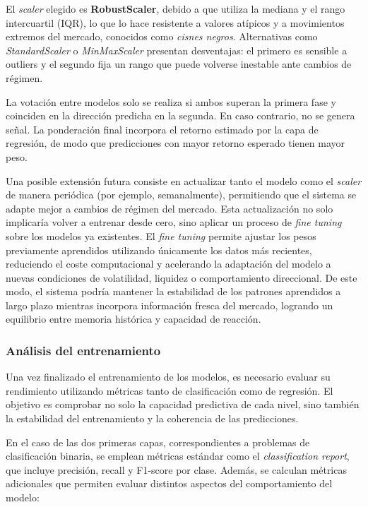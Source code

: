 El \textit{scaler} elegido es \textbf{RobustScaler}, debido a que utiliza la mediana y el rango intercuartil (IQR), lo que lo hace resistente a
valores atípicos y a movimientos extremos del mercado, conocidos como \textit{cisnes negros}. Alternativas como \textit{StandardScaler} o
\textit{MinMaxScaler} presentan desventajas: el primero es sensible a outliers y el segundo fija un rango que puede volverse inestable ante cambios de
régimen.

La votación entre modelos solo se realiza si ambos superan la primera fase y coinciden en la dirección predicha en la segunda. En caso contrario, no
se genera señal. La ponderación final incorpora el retorno estimado por la capa de regresión, de modo que predicciones con mayor retorno esperado
tienen mayor peso.

Una posible extensión futura consiste en actualizar tanto el modelo como el \textit{scaler} de manera periódica (por ejemplo, semanalmente),
permitiendo que el sistema se adapte mejor a cambios de régimen del mercado. Esta actualización no solo implicaría volver a entrenar desde cero, sino
aplicar un proceso de \textit{fine tuning} sobre los modelos ya existentes. El \textit{fine tuning} permite ajustar los pesos previamente aprendidos
utilizando únicamente los datos más recientes, reduciendo el coste computacional y acelerando la adaptación del modelo a nuevas condiciones de
volatilidad, liquidez o comportamiento direccional. De este modo, el sistema podría mantener la estabilidad de los patrones aprendidos a largo plazo
mientras incorpora información fresca del mercado, logrando un equilibrio entre memoria histórica y capacidad de reacción.

\subsubsection{Análisis del entrenamiento}

Una vez finalizado el entrenamiento de los modelos, es necesario evaluar su rendimiento utilizando métricas tanto de clasificación como de regresión.
El objetivo es comprobar no solo la capacidad predictiva de cada nivel, sino también la estabilidad del entrenamiento y la coherencia de las
predicciones.

En el caso de las dos primeras capas, correspondientes a problemas de clasificación binaria, se emplean métricas estándar como el
\textit{classification report}, que incluye precisión, recall y F1-score por clase. Además, se calculan métricas adicionales que permiten evaluar
distintos aspectos del comportamiento del modelo:

